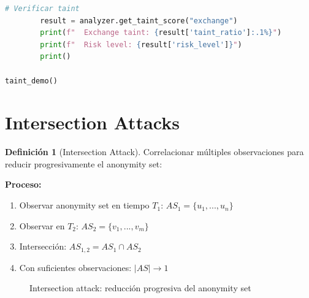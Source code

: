 \documentclass[11pt,a4paper,twoside]{book}
\theoremstyle{definition}
\newtheorem{definition}{Definición}[chapter]
\theoremstyle{remark}
\begin{document}
\begin{lstlisting}[language=Python, caption={Sistema de Taint Analysis}]
        # Verificar taint
        result = analyzer.get_taint_score("exchange")
        print(f"  Exchange taint: {result['taint_ratio']:.1%}")
        print(f"  Risk level: {result['risk_level']}")
        print()

taint_demo()
\end{lstlisting}
\section{Intersection Attacks}
\label{sec:intersection-attacks}

\begin{definition}[Intersection Attack]
Correlacionar múltiples observaciones para reducir progresivamente el anonymity set:

\textbf{Proceso:}
\begin{enumerate}
    \item Observar anonymity set en tiempo $T_1$: $AS_1 = \{u_1, ..., u_n\}$
    \item Observar en $T_2$: $AS_2 = \{v_1, ..., v_m\}$
    \item Intersección: $AS_{1,2} = AS_1 \cap AS_2$
    \item Con suficientes observaciones: $|AS| \rightarrow 1$
\end{enumerate}
\end{definition}

\begin{figure}[htbp]
\centering
{}
\caption{Intersection attack: reducción progresiva del anonymity set}
\label{fig:intersection-attack}
\end{figure}
\end{document}
